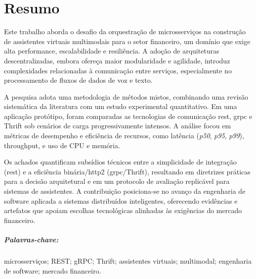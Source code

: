 \chapter*{Resumo}

Este trabalho aborda o desafio da orquestração de microsserviços na construção de assistentes virtuais multimodais para o setor financeiro, um domínio que exige alta performance, escalabilidade e resiliência. A adoção de arquiteturas descentralizadas, embora ofereça maior modularidade e agilidade, introduz complexidades relacionadas à comunicação entre serviços, especialmente no processamento de fluxos de dados de voz e texto.

A pesquisa adota uma metodologia de métodos mistos, combinando uma revisão sistemática da literatura com um estudo experimental quantitativo. Em uma aplicação protótipo, foram comparadas as tecnologias de comunicação \gls{rest}, \gls{grpc} e Thrift sob cenários de carga progressivamente intensos. A análise focou em métricas de desempenho e eficiência de recursos, como latência (\textit{p50}, \textit{p95}, \textit{p99}), throughput, e uso de CPU e memória.

Os achados quantificam subsídios técnicos entre a simplicidade de integração (\gls{rest}) e a eficiência binária/\acrshort{http}2 (\acrshort{grpc}/Thrift), resultando em diretrizes práticas para a decisão arquitetural e em um protocolo de avaliação replicável para sistemas de assistentes. A contribuição posiciona-se no avanço da engenharia de software aplicada a sistemas distribuídos inteligentes, oferecendo evidências e artefatos que apoiam escolhas tecnológicas alinhadas às exigências do mercado financeiro.

\paragraph{Palavras-chave:}microsserviços; REST; gRPC; Thrift; assistentes virtuais; multimodal; engenharia de software; mercado financeiro.
